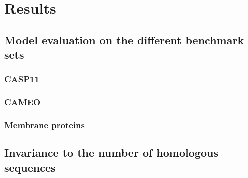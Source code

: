 \chapter{Results}

\section{Model evaluation on the different benchmark sets}

    \subsection{CASP11}

        \todo{}

    \subsection{CAMEO}

        \todo{}

    \subsection{Membrane proteins}

        \todo{}

\section{Invariance to the number of homologous sequences}

